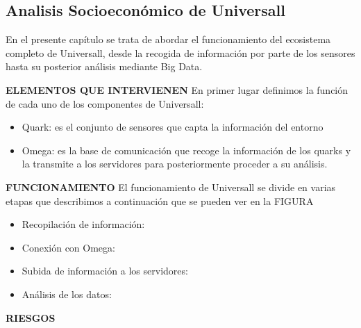 \subsection{Analisis Socioeconómico de Universall}

En el presente capítulo se trata de abordar el funcionamiento del ecosistema completo de Universall, desde la recogida de información por parte de los sensores hasta su posterior análisis mediante Big Data.

\textbf{ELEMENTOS QUE INTERVIENEN}
En primer lugar definimos la función de cada uno de los componentes de Universall:
\begin{itemize}
\item Quark: es el conjunto de sensores que capta la información del entorno
\item Omega: es la base de comunicación que recoge la información de los quarks y la transmite a los servidores para posteriormente proceder a su análisis.
\end{itemize}

\textbf{FUNCIONAMIENTO}
El funcionamiento de Universall se divide en varias etapas que describimos a continuación que se pueden ver en la FIGURA

\begin{itemize}
\item Recopilación de información:
\end{itemize}

\begin{itemize}
\item Conexión con Omega:
\end{itemize}

\begin{itemize}
\item Subida de información a los servidores:
\end{itemize}

\begin{itemize}
\item Análisis de los datos:
\end{itemize}



\textbf{RIESGOS}



